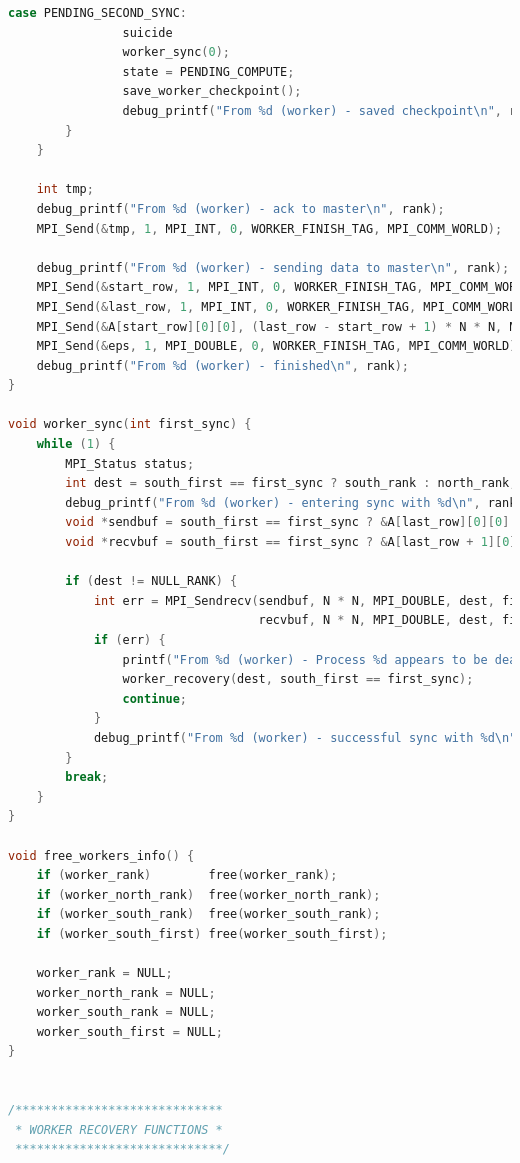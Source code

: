 \documentclass[a4paper]{article}
\begin{document}
\begin{lstlisting}[caption=jac\_3d\_mpi\_ft.c, label={lst:2}, language=C]
            case PENDING_SECOND_SYNC:
                suicide
                worker_sync(0);
                state = PENDING_COMPUTE;
                save_worker_checkpoint();
                debug_printf("From %d (worker) - saved checkpoint\n", rank);
        }
    }

    int tmp;
    debug_printf("From %d (worker) - ack to master\n", rank);
    MPI_Send(&tmp, 1, MPI_INT, 0, WORKER_FINISH_TAG, MPI_COMM_WORLD);

    debug_printf("From %d (worker) - sending data to master\n", rank);
    MPI_Send(&start_row, 1, MPI_INT, 0, WORKER_FINISH_TAG, MPI_COMM_WORLD);
    MPI_Send(&last_row, 1, MPI_INT, 0, WORKER_FINISH_TAG, MPI_COMM_WORLD);
    MPI_Send(&A[start_row][0][0], (last_row - start_row + 1) * N * N, MPI_DOUBLE, 0, WORKER_FINISH_TAG, MPI_COMM_WORLD);
    MPI_Send(&eps, 1, MPI_DOUBLE, 0, WORKER_FINISH_TAG, MPI_COMM_WORLD);
    debug_printf("From %d (worker) - finished\n", rank);
}

void worker_sync(int first_sync) {
    while (1) {
        MPI_Status status;
        int dest = south_first == first_sync ? south_rank : north_rank;
        debug_printf("From %d (worker) - entering sync with %d\n", rank, dest);
        void *sendbuf = south_first == first_sync ? &A[last_row][0][0] : &A[start_row][0][0];
        void *recvbuf = south_first == first_sync ? &A[last_row + 1][0][0] : &A[start_row - 1][0][0];

        if (dest != NULL_RANK) {
            int err = MPI_Sendrecv(sendbuf, N * N, MPI_DOUBLE, dest, first_sync ? FIRST_SYNC_TAG : SECOND_SYNC_TAG,
                                   recvbuf, N * N, MPI_DOUBLE, dest, first_sync ? FIRST_SYNC_TAG : SECOND_SYNC_TAG, MPI_COMM_WORLD, &status);
            if (err) {
                printf("From %d (worker) - Process %d appears to be dead\n", rank, dest);
                worker_recovery(dest, south_first == first_sync);
                continue;
            }
            debug_printf("From %d (worker) - successful sync with %d\n", rank, dest);
        } 
        break;
    } 
}

void free_workers_info() {
    if (worker_rank)        free(worker_rank);
    if (worker_north_rank)  free(worker_north_rank);
    if (worker_south_rank)  free(worker_south_rank);
    if (worker_south_first) free(worker_south_first);

    worker_rank = NULL;
    worker_north_rank = NULL;
    worker_south_rank = NULL;
    worker_south_first = NULL;
}


/*****************************
 * WORKER RECOVERY FUNCTIONS *
 *****************************/


\end{lstlisting}
\end{document}
